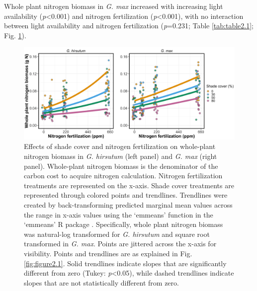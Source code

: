 Whole plant nitrogen biomass in \textit{G. max} increased with increasing light availability (\textit{p}<0.001) and nitrogen fertilization (\textit{p}<0.001), with no interaction between light availability and nitrogen fertilization (\textit{p}=0.231; Table \ref{tab:table2.1}; Fig. \ref{fig:figure2.2}).

\newpage
\begin{landscape}
\begin{figure}
    \includegraphics[width = \columnwidth]{ch2_LxN_Greenhouse/figs/fig2_nacq.jpg}
    \centering
    \caption[Effects of shade cover and nitrogen fertilization on whole-plant nitrogen biomass in \textit{G. hirsutum} and \textit{G. max}]{Effects of shade cover and nitrogen fertilization on whole-plant nitrogen biomass in \textit{G. hirsutum} (left panel) and \textit{G. max} (right panel). Whole-plant nitrogen biomass is the denominator of the carbon cost to acquire nitrogen calculation. Nitrogen fertilization treatments are represented on the x-axis. Shade cover treatments are represented through colored points and trendlines. Trendlines were created by back-transforming predicted marginal mean values across the range in x-axis values using the `emmeans’ function in the `emmeans’ R package . Specifically, whole plant nitrogen biomass was natural-log transformed for \textit{G. hirsutum} and square root transformed in \textit{G. max}. Points are jittered across the x-axis for visibility. Points and trendlines are as explained in Fig. \ref{fig:figure2.1}. Solid trendlines indicate slopes that are significantly different from zero (Tukey: \textit{p}<0.05), while dashed trendlines indicate slopes that are not statistically different from zero.}
    \label{fig:figure2.2}
    \small
\end{figure}
\end{landscape}
\clearpage

\newpage
